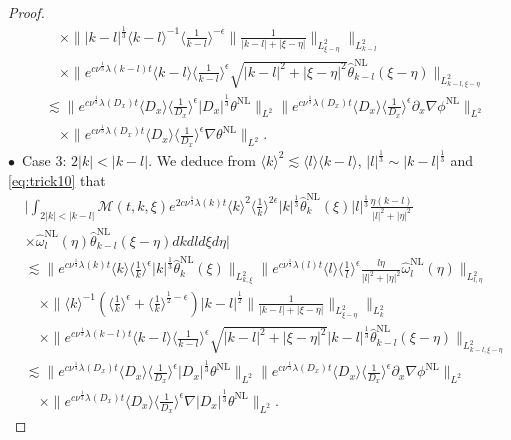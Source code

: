 \documentclass[reqno, 12pt]{amsart} %
\theoremstyle{plain} %
\theoremstyle{definition}
\theoremstyle{remark}
\numberwithin{equation}{section} %
\newcommand{\px}{\partial_x}
\begin{document}
\begin{proof}
\begin{align*}
			& \quad \times \||k-l|^\frac13 \langle k- l\rangle^{-1}\langle\frac{1}{k-l}\rangle^{-\epsilon}   \| \frac{1}{|k-l| + |\xi - \eta|} \|_{L_{\xi - \eta}^2}\|_{L_{k-l}^2}  \\
			& \quad \times  \|e^{c \nu^{\frac{1}{3}} \lambda(k-l) t}\langle k-l \rangle  \langle \frac{1}{k-l} \rangle^\epsilon   \sqrt{|k-l|^2 + |\xi - \eta|^2 } \hat{\theta}_{k-l}^{\mathrm{NL}}(\xi-\eta)\|_{L_{k-l, \xi-\eta}^2} \\
			& \lesssim\|e^{c \nu^{\frac{1}{3}} \lambda\left(D_x\right) t}\langle D_x\rangle    \langle \frac{1}{D_x}\rangle^\epsilon  \left|D_x\right|^{\frac{1}{3}} \theta^{\mathrm{NL}}\|_{L^2} \|e^{c \nu^{\frac{1}{3}} \lambda\left(D_x\right) t}\langle D_x\rangle\langle\frac{1}{D_x}\rangle^\epsilon \px \nabla \phi^{\mathrm{NL}}\|_{L^2} \\
			& \quad \times\|e^{c \nu^{\frac{1}{3}} \lambda\left(D_x\right) t}\langle D_x\rangle\langle\frac{1}{D_x}\rangle^\epsilon \nabla  \theta^{\mathrm{NL}}\|_{L^2} .
		\end{align*}
		$\bullet$~Case 3:   $2|k| < |k-l| $. We deduce from $ \langle k \rangle^2 \lesssim \langle l \rangle \langle k-l \rangle$, $|l|^\frac13 \sim |k-l|^\frac13 $ and \eqref{eq:trick10} that
		\begin{align*}
			& \bigg| \int_{2|k| <|k-l| } \mathcal{M}(t, k, \xi) e^{2 c \nu^{\frac{1}{3}} \lambda(k) t}\langle k\rangle^2\langle\frac{1}{k}\rangle^{2 \epsilon} |k|^\frac13\hat{\theta}_k^{\mathrm{NL}}(\xi) |l|^\frac13  \frac{\eta(k-l)}{|l|^2+|\eta|^2} \\
			& \times \hat{\omega}_l^{\mathrm{NL}}(\eta) \hat{\theta}_{k-l}^{\mathrm{NL}}(\xi-\eta) d k d l d \xi d \eta \bigg| \\
			& \lesssim\|e^{c \nu^{\frac{1}{3}} \lambda(k) t}  \langle k \rangle \langle \frac1k \rangle^\epsilon |k|^\frac13  \hat{\theta}_k^{\mathrm{NL}}(\xi)\|_{L_{k, \xi}^2}\|e^{c \nu^{\frac{1}{3}} \lambda(l) t}\langle l\rangle\langle\frac{1}{l}\rangle^\epsilon   \frac{l\eta}{|l|^2  + |\eta|^2} \hat{\omega}_l^{\mathrm{NL}}(\eta)\|_{L_{l, \eta}^2}         \\
			& \quad \times \|\langle k\rangle^{-1}   (\langle \frac1k \rangle^\epsilon  + \langle \frac1k \rangle^{\frac12-\epsilon}) |k-l|^\frac12   \| \frac{1}{|k-l| + |\xi - \eta|} \|_{L_{\xi - \eta}^2} \|_{L_{k}^2}  \\
			& \quad \times  \|e^{c \nu^{\frac{1}{3}} \lambda(k-l) t}\langle k-l \rangle  \langle \frac{1}{k-l} \rangle^\epsilon   \sqrt{|k-l|^2 + |\xi - \eta|^2 }|k-l| ^\frac13  \hat{\theta}_{k-l}^{\mathrm{NL}}(\xi-\eta)\|_{L_{k-l, \xi-\eta}^2} \\
			& \lesssim\|e^{c \nu^{\frac{1}{3}} \lambda\left(D_x\right) t}\langle D_x\rangle    \langle \frac{1}{D_x}\rangle^\epsilon  \left|D_x\right|^{\frac{1}{3}} \theta^{\mathrm{NL}}\|_{L^2} \|e^{c \nu^{\frac{1}{3}} \lambda\left(D_x\right) t}\langle D_x\rangle\langle\frac{1}{D_x}\rangle^\epsilon \px \nabla \phi^{\mathrm{NL}}\|_{L^2} \\
			& \quad \times\|e^{c \nu^{\frac{1}{3}} \lambda\left(D_x\right) t}\langle D_x\rangle\langle\frac{1}{D_x}\rangle^\epsilon \nabla \left|D_x\right|^{\frac{1}{3}} \theta^{\mathrm{NL}}\|_{L^2} .
		\end{align*}
		

\end{proof}
\end{document}
